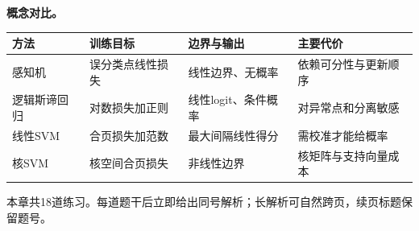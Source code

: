 \label{struct:V3-C02-CH31}
\begin{comparisonbox}
\textbf{概念对比。}\par\smallskip
\small
\begin{tabularx}{\linewidth}{@{}l X X X@{}}
\toprule 方法 & 训练目标 & 边界与输出 & 主要代价\\ \midrule
感知机 & 误分类点线性损失 & 线性边界、无概率 & 依赖可分性与更新顺序\\
逻辑斯谛回归 & 对数损失加正则 & 线性logit、条件概率 & 对异常点和分离敏感\\
线性SVM & 合页损失加范数 & 最大间隔线性得分 & 需校准才能给概率\\
核SVM & 核空间合页损失 & 非线性边界 & 核矩阵与支持向量成本\\
\bottomrule
\end{tabularx}
\end{comparisonbox}


\label{struct:V3-C02-CH34}
\begin{chapterexercisebox}
\label{struct:V3-C02-CH35}
本章共18道练习。每道题干后立即给出同号解析；长解析可自然跨页，续页标题保留题号。
\end{chapterexercisebox}

